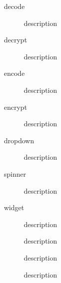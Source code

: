 \begin{description}
    \item[decode] description
    \item[decrypt] description
    \item[encode] description
    \item[encrypt] description
    \item[dropdown] description
    \item[spinner] description
    \item[widget] description
    \item[] description
    \item[] description
    \item[] description
\end{description}
\cleardoublepage
